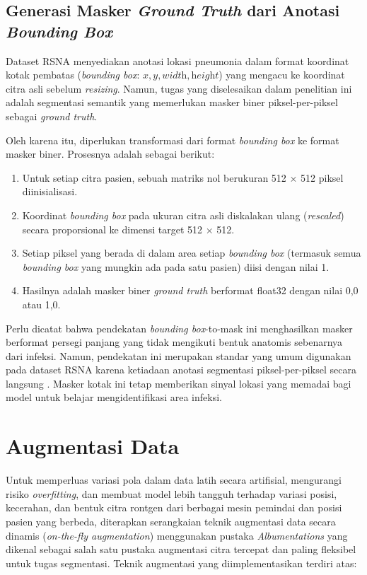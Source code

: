 \documentclass[12pt,a4paper,oneside]{book}
\begin{document}
\subsection{Generasi Masker \textit{Ground Truth} dari Anotasi \textit{Bounding Box}}

Dataset RSNA menyediakan anotasi lokasi pneumonia dalam format koordinat kotak pembatas (\textit{bounding box}: $x, y, \textit{width}, \textit{height}$) yang mengacu ke koordinat citra asli sebelum \textit{resizing}. Namun, tugas yang diselesaikan dalam penelitian ini adalah segmentasi semantik yang memerlukan masker biner piksel-per-piksel sebagai \textit{ground truth}.

Oleh karena itu, diperlukan transformasi dari format \textit{bounding box} ke format masker biner. Prosesnya adalah sebagai berikut:
\begin{enumerate}
  \item Untuk setiap citra pasien, sebuah matriks nol berukuran 512 $\times$ 512 piksel diinisialisasi.
  \item Koordinat \textit{bounding box} pada ukuran citra asli diskalakan ulang (\textit{rescaled}) secara proporsional ke dimensi target 512 $\times$ 512.
  \item Setiap piksel yang berada di dalam area setiap \textit{bounding box} (termasuk semua \textit{bounding box} yang mungkin ada pada satu pasien) diisi dengan nilai 1.
  \item Hasilnya adalah masker biner \textit{ground truth} berformat float32 dengan nilai 0,0 atau 1,0.
\end{enumerate}

Perlu dicatat bahwa pendekatan \textit{bounding box}-to-mask ini menghasilkan masker berformat persegi panjang yang tidak mengikuti bentuk anatomis sebenarnya dari infeksi. Namun, pendekatan ini merupakan standar yang umum digunakan pada dataset RSNA karena ketiadaan anotasi segmentasi piksel-per-piksel secara langsung \parencite{seth2022}. Masker kotak ini tetap memberikan sinyal lokasi yang memadai bagi model untuk belajar mengidentifikasi area infeksi.

\section{Augmentasi Data}

Untuk memperluas variasi pola dalam data latih secara artifisial, mengurangi risiko \textit{overfitting}, dan membuat model lebih tangguh terhadap variasi posisi, kecerahan, dan bentuk citra rontgen dari berbagai mesin pemindai dan posisi pasien yang berbeda, diterapkan serangkaian teknik augmentasi data secara dinamis (\textit{on-the-fly augmentation}) menggunakan pustaka \textit{Albumentations} yang dikenal sebagai salah satu pustaka augmentasi citra tercepat dan paling fleksibel untuk tugas segmentasi. Teknik augmentasi yang diimplementasikan terdiri atas:
\end{document}
